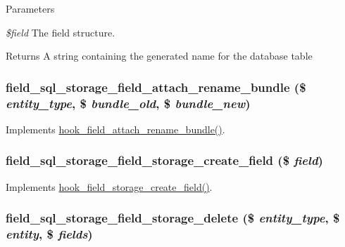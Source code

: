 \begin{DoxyParams}{Parameters}
\item[{\em \$field}]The field structure. \end{DoxyParams}
\begin{DoxyReturn}{Returns}
A string containing the generated name for the database table 
\end{DoxyReturn}
\hypertarget{field__sql__storage_8module_ad51eeafab2d7207352b5ad5acbd43b2c}{
\subsubsection[{field\_\-sql\_\-storage\_\-field\_\-attach\_\-rename\_\-bundle}]{\setlength{\rightskip}{0pt plus 5cm}field\_\-sql\_\-storage\_\-field\_\-attach\_\-rename\_\-bundle (\$ {\em entity\_\-type}, \/  \$ {\em bundle\_\-old}, \/  \$ {\em bundle\_\-new})}}
\label{field__sql__storage_8module_ad51eeafab2d7207352b5ad5acbd43b2c}
Implements \hyperlink{group__field__attach_gaf218d913150bda6004d5d8e112d3174a}{hook\_\-field\_\-attach\_\-rename\_\-bundle()}. \hypertarget{field__sql__storage_8module_aca1063eb51fc7044408b6629306f512a}{
\subsubsection[{field\_\-sql\_\-storage\_\-field\_\-storage\_\-create\_\-field}]{\setlength{\rightskip}{0pt plus 5cm}field\_\-sql\_\-storage\_\-field\_\-storage\_\-create\_\-field (\$ {\em field})}}
\label{field__sql__storage_8module_aca1063eb51fc7044408b6629306f512a}
Implements \hyperlink{group__field__storage_gac345df04a43f63941dd69c7d18e83e00}{hook\_\-field\_\-storage\_\-create\_\-field()}. \hypertarget{field__sql__storage_8module_a7a0c84776ec288e40108b28829288983}{
\subsubsection[{field\_\-sql\_\-storage\_\-field\_\-storage\_\-delete}]{\setlength{\rightskip}{0pt plus 5cm}field\_\-sql\_\-storage\_\-field\_\-storage\_\-delete (\$ {\em entity\_\-type}, \/  \$ {\em entity}, \/  \$ {\em fields})}}
